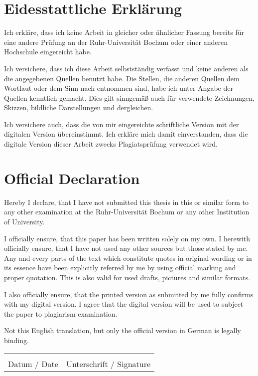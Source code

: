 
%

\chapter*{Eidesstattliche Erklärung}
Ich erkläre, dass ich keine Arbeit in gleicher oder ähnlicher Fassung bereits für eine andere Prüfung an der Ruhr-Universität Bochum oder einer anderen Hochschule eingereicht habe.

Ich versichere, dass ich diese Arbeit selbstständig verfasst und keine anderen als die angegebenen Quellen benutzt habe. Die Stellen, die anderen Quellen dem Wortlaut oder dem Sinn nach entnommen sind, habe ich unter Angabe der Quellen kenntlich gemacht. Dies gilt sinngemäß auch für verwendete Zeichnungen, Skizzen, bildliche Darstellungen und dergleichen.

Ich versichere auch, dass die von mir eingereichte schriftliche Version mit der digitalen Version übereinstimmt. Ich erkläre mich damit einverstanden, dass die digitale Version dieser Arbeit zwecks Plagiatsprüfung verwendet wird. 

{\let\clearpage\relax \chapter*{Official Declaration}}
Hereby I declare, that I have not submitted this thesis in this or similar form to any other examination at the Ruhr-Universität Bochum or any other Institution of University.

I officially ensure, that this paper has been written solely on my own. I herewith officially ensure, that I have not used any other sources but those stated by me. Any and every parts of the text which constitute quotes in original wording or in its essence have been explicitly referred by me by using official marking and proper quotation. This is also valid for used drafts, pictures and similar formats.

I also officially ensure, that the printed version as submitted by me fully confirms with my digital version. I agree that the digital version will be used to subject the paper to plagiarism examination.

Not this English translation, but only the official version in German is legally binding. 

\vspace{2cm}
\begin{tabular}{ll}
	\makebox[5cm]{\hrulefill} & \makebox[5cm]{\hrulefill} \\
	Datum / Date  & Unterschrift / Signature 
\end{tabular}


